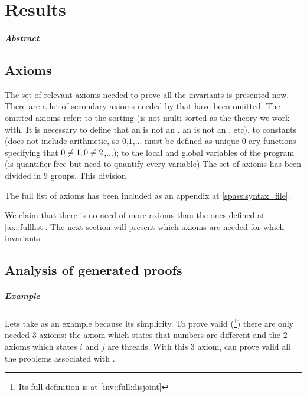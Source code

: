 \chapter{Results\label{chap:results}}

\paragraph{Abstract}


\section{Axioms}

The set of relevant axioms needed to prove all the invariants is presented now.
%
There are a lot of secondary axioms needed by \spass that have been omitted. 
%
The omitted axioms refer: 
%
to the sorting (\spass is not multi-sorted as the theory we work with. It is necessary to define that an \addr is not an \elem, an \elem is not an \addr, etc), to constants (\spass does not include arithmetic, so $0$,$1$,... must be defined as unique 0-ary functions specifying that $0\not= 1,0\not= 2$,...); 
%
to the local and global variables of the program (\leap is quantifier free but \spass need to quantify every variable)
%
The set of axioms has been divided in 9 groups. 
%
This division 
		
\label{ax::fulllist}



The full list of axioms has been included as an appendix at \ref{spass:syntax_file}. 

%

We claim that there is no need of more axioms than the ones defined at \ref{ax::fulllist}. 
%
The next section will present which axioms are needed for which invariants.

\section{Analysis of generated proofs}
\label{proof:Preserve}
\label{sec:axiomgraph}

\paragraph{Example}
Lets take \invDisjoint as an example because its simplicity.
%
To prove \invDisjoint valid
%
(\footnote{Its full definition is at \ref{inv::full:disjoint}})
%
there are only needed 3 axioms: the axiom which states that numbers are different and the 2 axioms which states $i$ and $j$ are threads. 
%
With this 3 axiom, \spass can prove valid all the \spass problems associated with \invDisjoint.



